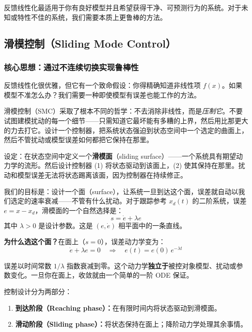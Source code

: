 反馈线性化最适用于你有良好模型并且希望获得干净、可预测行为的系统。对于未知或特性不佳的系统，我们需要本质上更鲁棒的方法。

\subsection{滑模控制（Sliding Mode Control）}

\subsubsection{核心思想：通过不连续切换实现鲁棒性}

反馈线性化很优雅，但它有一个致命假设：你得精确知道非线性项 $f(x)$。如果模型不准怎么办？我们需要一种即使模型有误差也能工作的方法。

滑模控制（SMC）采取了根本不同的哲学：不去消除非线性，而是\textit{压制它}。不要试图建模扰动的每一个细节——只需知道它最坏能有多糟的上界，然后用比那更大的力去打它。设计一个控制器，把系统状态强迫到状态空间中一个选定的曲面上，然后不管扰动或模型误差如何都把它保持在那里。

设定：在状态空间中定义一个\textbf{滑模面}（sliding surface）——一个系统具有期望动力学的流形。然后设计控制器 (1) 将状态驱动到该面上，(2) 使其保持在那里。扰动和模型误差无法将状态踢离该面，因为控制器在持续修正。

我们的目标是：设计一个面（surface），让系统一旦到达这个面，误差就自动以我们选定的速率衰减——不管有什么扰动。对于跟踪参考 $x_d(t)$ 的二阶系统，误差 $e = x - x_d$，滑模面的一个自然选择是：
\begin{equation}
s = \dot{e} + \lambda e
\end{equation}
其中 $\lambda > 0$ 是设计参数。这是 $(e, \dot{e})$ 相平面中的一条直线。

\textbf{为什么选这个面？}在面上（$s = 0$），误差动力学变为：
\begin{equation}
\dot{e} + \lambda e = 0 \quad \Longrightarrow \quad e(t) = e(0)\,e^{-\lambda t}
\end{equation}

误差以时间常数 $1/\lambda$ 指数衰减到零。这个动力学\textbf{独立于}被控对象模型、扰动或参数变化。一旦你在面上，收敛就由一个简单的一阶 ODE 保证。

控制设计分为两部分：
\begin{enumerate}
    \item \textbf{到达阶段（Reaching phase）：}在有限时间内将状态驱动到滑模面。
    \item \textbf{滑动阶段（Sliding phase）：}将状态保持在面上；降阶动力学处理其余事情。
\end{enumerate}

